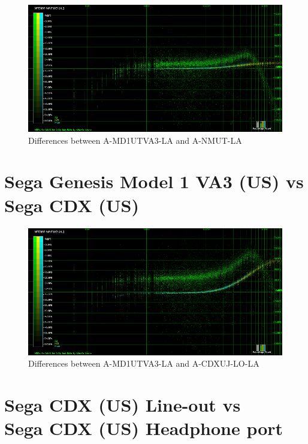 \documentclass[10pt,a4paper]{report}
\begin{document}
\begin{figure}[H]
	\centering
	\includegraphics[width=1.0\linewidth]{images/results/6-A-MD1UTVA3-LA_vs_A-NMUT_LA.png}
	\caption[A-MD1UTVA3-LA vs A-NMUT-LA]{Differences between A-MD1UTVA3-LA and A-NMUT-LA}
	\label{fig:A-MD1UTVA3-LA_vs_A-NMUT_LA}
\end{figure}

\section{Sega Genesis Model 1 VA3 (US) vs\\ Sega CDX (US)}

\begin{figure}[H]
	\centering
	\includegraphics[width=1.0\linewidth]{images/results/7-A-MD1UTVA3-LA_vs_A-CDXUJ-LO_LA.png}
	\caption[A-MD1UTVA3-LA vs A-CDXUJ-LO-LA]{Differences between A-MD1UTVA3-LA and A-CDXUJ-LO-LA}
	\label{fig:A-MD1UTVA3-LA_vs_A-CDXUJ-LO_LA}
\end{figure}

\section{Sega CDX (US) Line-out vs\\ Sega CDX (US) Headphone port}
\end{document}
